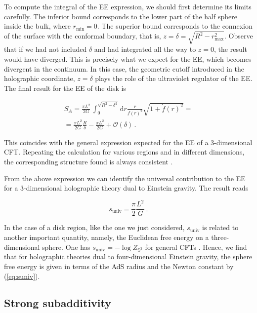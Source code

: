 \documentclass[twocolumn]{revtex4}
\providecommand{\eq}[2]{
    \begin{equation}
        #2
    \label{eq:#1}
    \end{equation}
}
\providecommand{\eqgat}[2]{
    \begin{gather}
        #2
    \label{eq:#1}
    \end{gather}
}
\begin{document}
To compute the integral of the EE expression, we should first determine its limits carefully. The inferior bound corresponds to the lower part of the half sphere inside the bulk, where $r_\text{min}=0$. The superior bound corresponds to the connexion of the surface with the conformal boundary, that is, $z=\delta=\sqrt{R^2-r_\text{max}^2}$. Observe that if we had not included $\delta$ and had integrated all the way to $z=0$, the result would have diverged. This is precisely what we expect for the EE, which becomes divergent in the continuum. In this case, the geometric cutoff introduced in the holographic coordinate, $z=\delta$ plays the role of the ultraviolet regulator of the EE. The final result for the EE of the disk is 
\eqgat{1sol}{
    S_A = \frac{\pi L^2}{2G} \, \int_0^{\sqrt{R^2-\delta^2}} \mathrm{d}r \frac{r}{f(r)^2} \sqrt{ 1 + \dot{f}(r)^2 } = \nonumber \\
    = \frac{\pi L^2}{2G} \frac{R}{\delta} - \frac{\pi L^2}{2G}+\mathcal{O}(\delta) \, . \nonumber
}
This coincides with the general expression expected for the EE of  a 3-dimensional CFT. Repeating the calculation for various regions and in different dimensions, the corresponding structure found is always consistent \cite{ryu_aspects_2006,ryu_holographic_2008}. 

From the above expression we can identify the universal contribution to the EE for a 3-dimensional holographic theory dual to Einstein gravity. The result reads
\eq{suniv}{
     s_\text{univ} = \frac{\pi}{2} \frac{L^2}{G} \ .
}

In the case of a disk region, like the one we just considered, $s_\text{univ}$ is related to another important quantity, namely, the Euclidean free energy on a three-dimensional sphere. One has $s_\text{univ}= -\log Z_{\mathbb{S}^3}$ for general CFTs \cite{casini_towards_2011}. Hence, we find that for holographic theories dual to four-dimensional Einstein gravity, the sphere free energy is given in terms of the AdS radius and the Newton constant by (\ref{eq:suniv}).


\subsection{Strong subadditivity} \label{ss:SS}
\end{document}

